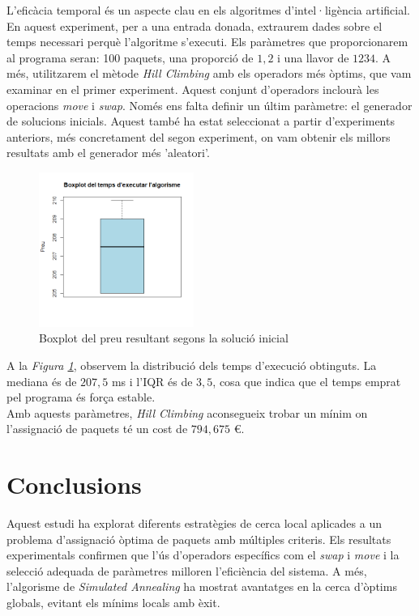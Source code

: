 \documentclass[a4paper]{article}
\begin{document}
	L'eficàcia temporal és un aspecte clau en els algoritmes d'intel·ligència artificial. En aquest experiment, per a una entrada donada, extraurem dades sobre el temps necessari perquè l'algoritme s'executi. Els paràmetres que proporcionarem al programa seran: 100 paquets, una proporció de $1,2$ i una llavor de $1234$. A més, utilitzarem el mètode \textit{Hill Climbing} amb els operadors més òptims, que vam examinar en el primer experiment. Aquest conjunt d'operadors inclourà les operacions \textit{move} i \textit{swap}. Només ens falta definir un últim paràmetre: el generador de solucions inicials. Aquest també ha estat seleccionat a partir d'experiments anteriors, més concretament del segon experiment, on vam obtenir els millors resultats amb el generador més 'aleatori'. \\
	
	\begin{figure}[H]
		\centering
		\includegraphics[width=0.45\textwidth]{images/exp9_boxplot.png}
		\caption{Boxplot del preu resultant segons la solució inicial}
		\label{fig:exp9_boxplot}
	\end{figure}
	
	A la \textit{Figura \ref{fig:exp9_boxplot}}, observem la distribució dels temps d'execució obtinguts. La mediana és de $207,5$ ms i l'IQR és de $3,5$, cosa que indica que el temps emprat pel programa és força estable. \\
	
	Amb aquests paràmetres, \textit{Hill Climbing} aconsegueix trobar un mínim on l'assignació de paquets té un cost de $794,675$ €.
	
	\newpage
	\section{Conclusions}

	Aquest estudi ha explorat diferents estratègies de cerca local aplicades a un problema d'assignació òptima de paquets amb múltiples criteris. Els resultats experimentals confirmen que l'ús d'operadors específics com el \textit{swap} i \textit{move} i la selecció adequada de paràmetres milloren l'eficiència del sistema. A més, l'algorisme de \textit{Simulated Annealing} ha mostrat avantatges en la cerca d'òptims globals, evitant els mínims locals amb èxit. \\
	
\end{document}
